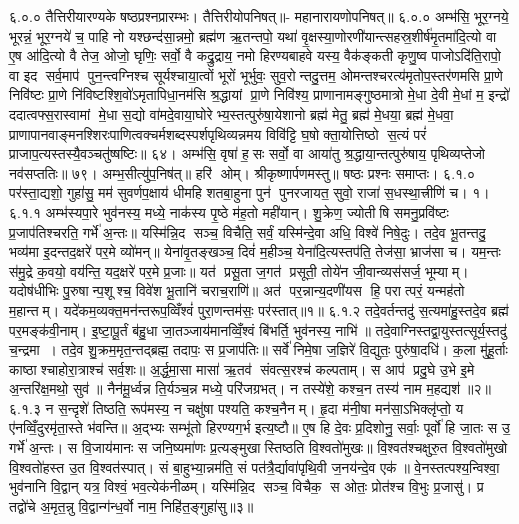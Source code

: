 \setcounter{anuvakam}{0}
६.०.०
तैत्तिरीयारण्यके षष्ठप्रश्नप्रारम्भः। तैत्तिरीयोपनिषत्॥- महानारायणोपनिषत्॥
६.०.०
अम्भ॑सि॒ भूर॒ग्नये॒ भूरन्नं॒ भूर॒ग्नये॑ च॒ पाहि नो यश्छन्द॑सा॒न्नमो॒ ब्रह्म॑ण ऋ॒तन्तपो॒ यथा॑ वृ॒क्षस्या॒णोरणी॑यान्त्सहस्र॒शीर्\mbox{}ष॑मृ॒तमा॑दि॒त्यो वा ए॒ष आ॑दि॒त्यो वै तेज॒ ओजो॒ घृणिः॒ सर्वो॒ वै कद्रु॒द्राय॒ नमो हिरण्यबाहवे यस्य॒ वैक॑ङ्कती कृणु॒ष्व पाजोऽदि॑ति॒रापो॒ वा इद सर्व॒माप॑ पुन॒न्त्वग्निश्च सूर्यश्चाया॒त्वों भूरों भूर्भुवः॒ सुव॒रोन्तदु॒त्तम॒ ओमन्तश्चरत्य॑मृतोप॒स्तर॑णमसि प्रा॒णे निवि॑ष्टः प्रा॒णे नि॑विष्टश्शि॒वो॑ऽमृतापिधा॒नम॑सि श्र॒द्धायां प्रा॒णे निवि॑श्य॒ प्राणानामङ्गुष्ठमात्रो मे॒धा दे॒वी मे॒धां म॒ इन्द्रो॑ ददात्वफ्स॒रास्वामां मे॒धा स॒द्यो वा॑मदे॒वाया॒घोरेभ्य॒स्तत्पुरु॑षा॒येशानो ब्रह्म॑ मेतु॒ ब्रह्म॑ मे॒धया॒ ब्रह्म॑ मे॒धवा॒ प्राणापानवाङ्मनश्शिरःपाणित्वक्चर्मशब्दस्पर्शपृथिव्यन्नमय विवि॑ट्टि घ॒षोक्ता॒योत्तिष्ठो स॒त्यं परं॑ प्राजाप॒त्यस्तस्यै॒वञ्चतु॑ष्षष्टिः॥ ६४। अम्भ॑सि॒ वृषा॑ ह॒सः सर्वो॒ वा आया॑तु श्र॒द्धाया॒न्तत्पुरु॑षाय॒ पृथिव्यप्तेजो नव॑सप्ततिः॥ ७९। अम्भ॒सीत्यु॑प॒निष॑त्॥ हरि॑ ओम्। श्रीकृष्णार्पणमस्तु॥ षष्ठः प्रश्नः समाप्तः।
६.१.०
पर॑स्ता॒द्यशो॒ गुहा॑सु॒ मम॑ सुवर्णप॒क्षाय॑ धीमहि शतबा॒हुना पुन॑ पुनरजायत॒ सुवो॒ राजा॑ स॒धस्था॒त्त्रीणि॑ च। १।
६.१.१
अम्भ॑स्यपा॒रे भुव॑नस्य॒ मध्ये॒ नाक॑स्य पृ॒ष्ठे म॑ह॒तो मही॑यान्। शु॒क्रेण॒ ज्योतीषि समनु॒प्रवि॑ष्टः प्र॒जाप॑तिश्चरति॒ गर्भे॑ अ॒न्तः॥ यस्मि॑न्नि॒द सञ्च॒ विचैति॒ सर्वं॒ यस्मि॑न्दे॒वा अधि॒ विश्वे॑ निषे॒दुः। तदे॒व भू॒तन्तदु॒ भव्य॑मा इ॒दन्तद॒क्षरे॑ पर॒मे व्यो॑मन्॥ येना॑वृ॒तङ्खञ्च॒ दिवं॑ म॒हीञ्च॒ येना॑दि॒त्यस्तप॑ति॒ तेज॑सा॒ भ्राज॑सा च। यम॒न्तः स॑मु॒द्रे क॒वयो॒ वय॑न्ति॒ यद॒क्षरे॑ पर॒मे प्र॒जाः॥ यत॑ प्रसू॒ता ज॒गत॑ प्रसूती॒ तोये॑न जी॒वान्व्यस॑सर्ज॒ भूम्याम्। यदोष॑धीभिः पु॒रुषान्प॒शूश्च॒ विवे॑श भू॒तानि॑ चराच॒राणि॑॥ अत॑ पर॒न्नान्य॒दणी॑यस हि॒ परात्परं॒ यन्मह॑तो म॒हान्तम्। यदे॑कम॒व्यक्त॒मन॑न्तरूप॒व्विँश्वं॑ पुरा॒णन्तम॑सः॒ पर॑स्तात्॥१॥
६.१.२
तदे॒वर्तन्तदु॑ स॒त्यमा॑हु॒स्तदे॒व ब्रह्म॑ पर॒मङ्क॑वी॒नाम्। इ॒ष्टा॒पू॒र्तं ब॑हु॒धा जा॒तञ्जाय॑मानव्विँ॒श्वं बि॑भर्ति॒ भुव॑नस्य॒ नाभि॑॥ तदे॒वाग्निस्तद्वा॒युस्तत्सूर्य॒स्तदु॑ च॒न्द्रमा। तदे॒व शु॒क्रम॒मृत॒न्तद्ब्रह्म॒ तदापः॒ स प्र॒जाप॑तिः॥ सर्वे॑ निमे॒षा ज॒ज्ञिरे॑ वि॒द्युतः॒ पुरु॑षा॒दधि॑। क॒ला मु॑हू॒र्ताः काष्ठाश्चाहोरा॒त्राश्च॑ सर्व॒शः॥ अ॒र्द्ध॒मा॒सा मासा॑ ऋ॒तव॑ संवत्स॒रश्च॑ कल्पताम्। स आप॑ प्रदु॒घे उ॒भे इ॒मे अ॒न्तरि॑क्ष॒मथो॒ सुव॑॥ नैन॑मू॒र्ध्वन्न ति॒र्यञ्च॒न्न मध्ये॒ परि॑जग्रभत्। न तस्ये॑शे॒ कश्च॒न तस्य॑ नाम म॒हद्यश॑॥२॥
६.१.३
न स॒न्दृशे॑ तिष्ठति॒ रूप॑मस्य॒ न चक्षु॑षा पश्यति॒ कश्च॒नैनम्। हृ॒दा म॑नी॒षा मन॑सा॒ऽभिक्लृ॑प्तो॒ य ए॑नव्विँ॒दुरमृ॑ता॒स्ते भ॑वन्ति॥ अ॒द्भ्यः सम्भू॑तो हिरण्यग॒र्भ इत्य॒ष्टौ॥ ए॒ष हि दे॒वः प्र॒दिशोनु॒ सर्वाः॒ पूर्वो॑ हि जा॒तः स उ॒ गर्भे॑ अ॒न्तः। स वि॒जाय॑मानः स जनि॒ष्यमा॑णः प्र॒त्यङ्मुखास्तिष्ठति वि॒श्वतो॑मुखः॥ वि॒श्वत॑श्चक्षुरु॒त वि॒श्वतो॑मुखो वि॒श्वतो॑हस्त उ॒त वि॒श्वत॑स्पात्। सं बा॒हुभ्या॒न्नम॑ति॒ सं पत॑त्रै॒र्द्यावा॑पृथि॒वी ज॒नय॑न्दे॒व एक॑॥ वे॒नस्तत्पश्य॒न्विश्वा॒ भुव॑नानि वि॒द्वान् यत्र॒ विश्वं॒ भव॒त्येक॑नीळम्। यस्मि॑न्नि॒द सञ्च॒ विचैक॒ स ओतः॒ प्रोत॑श्च वि॒भुः प्र॒जासु॑। प्र तद्वो॑चे अ॒मृत॒न्नु वि॒द्वान्ग॑न्ध॒र्वो नाम॒ निहि॑त॒ङ्गुहा॑सु॥३॥
